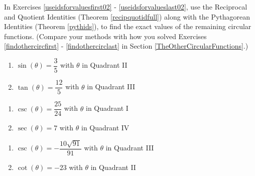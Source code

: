 In Exercises \ref{useidsforvaluesfirst02} - \ref{useidsforvalueslast02}, use the Reciprocal and Quotient Identities (Theorem \ref{recipquotidfull}) along with the Pythagorean Identities (Theorem \ref{pythids}), to find the exact values of the remaining circular functions.  (Compare your methods with how you solved Exercises \ref{findothercircfirst} - \ref{findothercirclast} in Section \ref{TheOtherCircularFunctions}.)


\begin{multicols}{2}

\begin{enumerate}


\setcounter{enumi}{\value{HW}}

\item $\sin(\theta) = \dfrac{3}{5}$ with $\theta$ in Quadrant II \label{useidsforvaluesfirst02}
\item $\tan(\theta) = \dfrac{12}{5}$ with $\theta$ in Quadrant III

\setcounter{HW}{\value{enumi}}

\end{enumerate}

\end{multicols}

\begin{multicols}{2}

\begin{enumerate}

\setcounter{enumi}{\value{HW}}

\item $\csc(\theta) = \dfrac{25}{24}$ with $\theta$ in Quadrant I
\item $\sec(\theta) = 7$ with $\theta$ in Quadrant IV 

\setcounter{HW}{\value{enumi}}

\end{enumerate}

\end{multicols}

\begin{multicols}{2}

\begin{enumerate}

\setcounter{enumi}{\value{HW}}

\item $\csc(\theta) = -\dfrac{10\sqrt{91}}{91}$ with $\theta$ in Quadrant III
\item $\cot(\theta) = -23$ with $\theta$ in Quadrant II 

\setcounter{HW}{\value{enumi}}

\end{enumerate}

\end{multicols}

